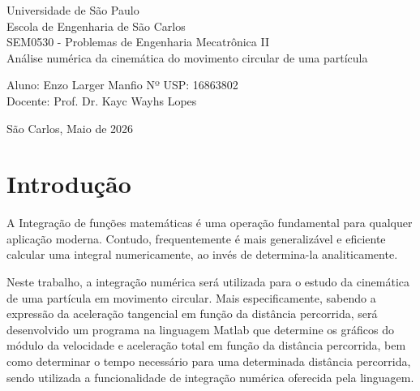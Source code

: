 \documentclass[12pt,a4paper]{article}
\begin{document}
\begin{titlepage}
    \begin{center}
		\Huge{Universidade de São Paulo}\\
		\large{Escola de Engenharia de São Carlos}\\ 
        \large{SEM0530 - Problemas de Engenharia Mecatrônica II}\\ 
        \vspace{5cm}
		\Large{Análise numérica da cinemática do movimento circular de uma partícula}\\ 
		\vspace{0.3cm}
    
    \end{center}
\vspace{5cm}
	\begin{flushleft}
		
		Aluno: Enzo Larger Manfio  Nº USP: 16863802\\
        Docente: Prof. Dr. Kayc Wayhs Lopes\\
	
    \end{flushleft}
	
	\vfill
	\begin{center}
		\vspace{5cm}
			 São Carlos, Maio de 2026
	\end{center}
\end{titlepage}

\newpage
\tableofcontents


\newpage
\section{Introdução}
\par A Integração de funções matemáticas é uma operação fundamental para qualquer aplicação moderna. Contudo, frequentemente é mais generalizável e eficiente calcular uma integral numericamente, ao invés de determina-la analiticamente.
\par Neste trabalho, a integração numérica será utilizada para o estudo da cinemática de uma partícula em movimento circular. Mais especificamente, sabendo a expressão da aceleração tangencial em função da distância percorrida, será desenvolvido um programa na linguagem Matlab que determine os gráficos do módulo da velocidade e aceleração total em função da distância percorrida, bem como determinar o tempo necessário para uma determinada distância percorrida, sendo utilizada a funcionalidade de integração numérica oferecida pela linguagem.
\vspace{0.5\baselineskip}
\end{document}

